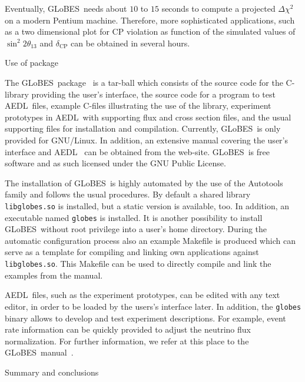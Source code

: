 \documentclass[12pt,a4paper]{article}
\makeatletter
\renewcommand{\section}{\@startsection{section}{1}{0em}{-\baselineskip}%
{\baselineskip}{\normalfont\large\bfseries}}
\newcommand{\deltacp}{\delta_{\mathrm{CP}}}
\newcommand{\stheta}{\sin^2 2 \theta_{13}}
\newcommand{\GLOBES}{{\sf GLoBES}}
\newcommand{\AEDL}{{\sf AEDL}}
\makeatother
\begin{document}
Eventually, \GLOBES\ needs about $10$ to $15$ seconds to compute
a projected $\Delta \chi^2$ on a modern Pentium machine. Therefore,
more sophisticated applications, such as a two dimensional plot
for CP violation as function of the simulated values of $\stheta$ and
$\deltacp$ can be obtained in several hours.

\section{Use of package}

The \GLOBES\ package~\cite{Globes} is a tar-ball which consists of the
source code for the C-library providing the user's interface, the source code
 for a program to test
\AEDL\ files, example C-files illustrating the use of the library, 
experiment prototypes in \AEDL\ with supporting flux and cross 
section files, and the usual 
supporting files for installation and compilation.
Currently, \GLOBES\ is only provided for GNU/Linux.
In addition, an extensive manual covering the user's interface and 
\AEDL~\cite{Manual} 
can be obtained from the web-site. \GLOBES\ is free software and as such 
licensed under the GNU Public License.

The installation of \GLOBES\ is highly automated by the use of the
Autotools family and follows the usual procedures. By default
a shared library {\tt libglobes.so} is installed, but 
a static version is available, too. In addition, an executable named {\tt globes} is installed. It is another possibility to install \GLOBES\ without
root privilege into a user's home directory. During the automatic
configuration process also an example Makefile is produced which can
serve as a template for compiling and linking own applications against
{\tt libglobes.so}. This Makefile can be used to directly compile and
link the examples
from the manual. 

\AEDL\ files, such as the experiment prototypes,
can be edited with any text editor, in order to be loaded by the
users's interface later. In addition, the {\tt globes} binary allows to
develop and test experiment descriptions. For example, event rate
information can be quickly provided to adjust the neutrino flux
normalization. For further information, we refer
at this place to the \GLOBES\ manual~\cite{Manual}.

\section{Summary and conclusions}
\end{document}
